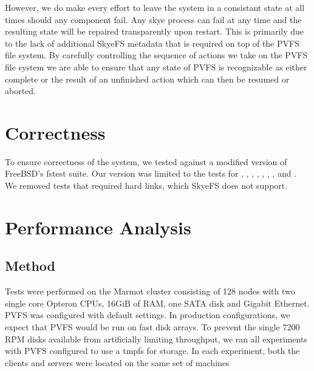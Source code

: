 \documentclass[onecolumn, 11pt, letterpaper]{article}
\begin{document}
However, we do make every effort to leave the system in a consistant state at
all times should any component fail.  Any skye process can fail at any time
and the resulting state will be repaired transparently upon restart.  This is
primarily due to the lack of additional SkyeFS metadata that is required on
top of the PVFS file system.  By carefully controlling the sequence of actions
we take on the PVFS file system we are able to ensure that any state of PVFS
is recognizable as either complete or the result of an unfinished action which
can then be resumed or aborted.

\section{Correctness}
To ensure correctness of the system, we tested against a modified version of
FreeBSD's fstest suite.\cite{fstest} Our version was limited to the tests for
, , , , ,
, ,  and .  We removed
tests that required hard links, which SkyeFS does not support.

\section{Performance Analysis}

\subsection{Method}
Tests were performed on the Marmot cluster consisting of 128 nodes with two
single core Opteron CPUs, 16GiB of RAM, one SATA disk and Gigabit Ethernet.
PVFS was configured with default settings.  In production configurations, we
expect that PVFS would be run on fast disk arrays.  To prevent the single 7200
RPM disks available from artificially limiting throughput, we ran all
experiments with PVFS configured to use a tmpfs for storage.  In each
experiment, both the clients and servers were located on the same set of
machines
\end{document}
